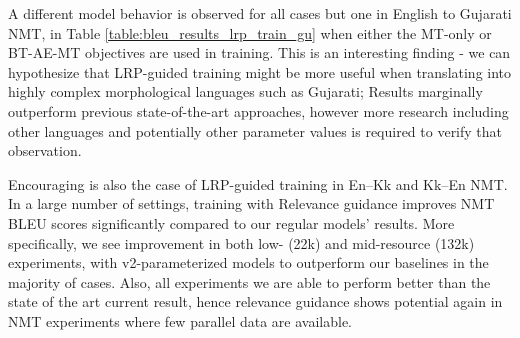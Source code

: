 \documentclass[11pt]{article}
\begin{document}
A different model behavior is observed for all cases but one in English to Gujarati NMT, in Table \ref{table:bleu_results_lrp_train_gu} when either the MT-only or BT-AE-MT objectives are used in training. This is an interesting finding - we can hypothesize that LRP-guided training might be more useful when translating into highly complex morphological languages such as Gujarati; Results marginally outperform previous state-of-the-art approaches, however more research including other languages and potentially other parameter values is required to verify that observation.

Encouraging is also the case of LRP-guided training in En--Kk and Kk--En NMT. In a large number of settings, training with Relevance guidance improves NMT BLEU scores significantly compared to our regular models' results. More specifically, we see improvement in both low- (22k) and mid-resource (132k) experiments, with v2-parameterized models to outperform our baselines in the majority of cases. Also, all experiments we are able to perform better than the state of the art current result, hence relevance guidance shows potential again in NMT experiments where few parallel data are available.

%
%
%









\end{document}
